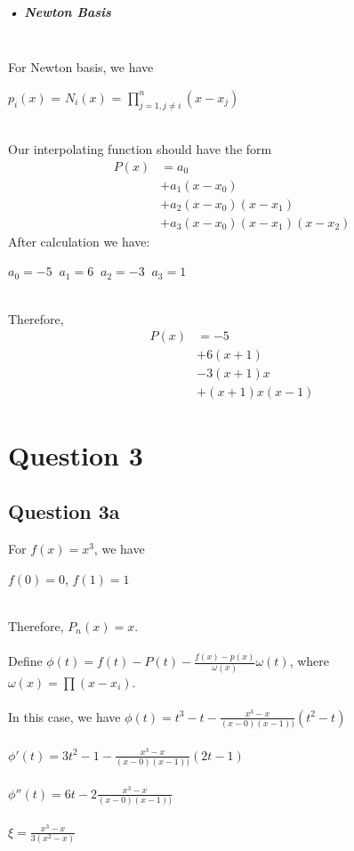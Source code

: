 \documentclass[11pt]{article} %
\begin{document}
\subparagraph{• Newton Basis}\mbox{}\\
For Newton basis, we have\\
\centerline{$p_{i}(x)$ = $N_{i}(x)$ = $\prod_{j=1,j \neq i}^{n}(x-x_{j})$ }\\
Our interpolating function should have the form\\
\begin{equation}
\begin{split}
P(x) &= a_{0}\\
&+a_{1}(x-x_{0})\\
&+a_{2}(x-x_{0})(x-x_{1})\\
&+a_{3}(x-x_{0})(x-x_{1})(x-x_{2})
\end{split}
\end{equation}
After calculation we have:\\
\centerline{$a_{0}=-5\;\;a_{1}=6\;\;a_{2}=-3\;\;a_{3}=1$}\\
Therefore,
\begin{equation}
\begin{split}
P(x) &= -5\\
&+6(x+1)\\
&-3(x+1)x\\
&+(x+1)x(x-1)
\end{split}
\end{equation}
\section{Question 3}
\subsection{Question 3a}
For $f(x) = x^{3}$, we have\\
\centerline{$f(0)=0$, $f(1)=1$}\\
Therefore, $P_{n}(x)=x$.\\\\
Define $\phi(t) = f(t)-P(t)-\frac{f(x)-p(x)}{\omega(x)}\omega(t)$, where $\omega(x) = \prod(x-x_{i})$.\\\\
In this case, we have $\phi(t) = t^{3}-t-\frac{x^{3}-x}{(x-0)(x-1))}(t^{2}-t)$\\\\
$\phi'(t) = 3t^{2}-1-\frac{x^{3}-x}{(x-0)(x-1))}(2t-1)$\\\\
$\phi''(t) = 6t-2\frac{x^{3}-x}{(x-0)(x-1))}$\\\\
$\xi = \frac{x^3-x}{3(x^2-x)}$
\end{document}
